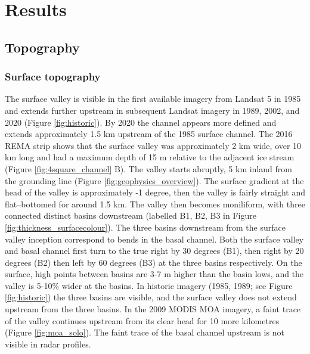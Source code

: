 
\section{Results} \label{sec:results}

\subsection{Topography} \label{sec:topography}

\subsubsection{Surface topography} \label{sec:surfacetopog}
The surface valley is visible in the first available imagery from Landsat 5 in 1985 and extends further upstream in subsequent Landsat imagery in 1989, 2002, and 2020 (Figure \ref{fig:historic}). By 2020 the channel appears more defined and extends approximately 1.5 km upstream of the 1985 surface channel. The 2016 REMA strip shows that the surface valley was approximately 2 km wide, over 10 km long and had a maximum depth of 15 m relative to the adjacent ice stream (Figure \ref{fig:4square_channel} B). The valley starts abruptly, 5 km inland from the \cite{depoorter2013amii} grounding line (Figure \ref{fig:geophysics_overview}). The surface gradient at the head of the valley is approximately -1 degree, then the valley is fairly straight and flat--bottomed for around 1.5 km. The valley then becomes moniliform, with three connected distinct basins downstream (labelled B1, B2, B3 in Figure \ref{fig:thickness_surfacecolour}).
The three basins downstream from the surface valley inception correspond to bends in the basal channel. Both the surface valley and basal channel first turn to the true right by 30 degrees (B1), then right by 20 degrees (B2) then left by 60 degrees (B3) at the three basins respectively. On the surface, high points between basins are 3-7 m higher than the basin lows, and the valley is 5-10\% wider at the basins.
In historic imagery (1985, 1989; see Figure \ref{fig:historic}) the three basins are visible, and the surface valley does not extend upstream from the three basins. 
In the 2009 MODIS MOA imagery, a faint trace of the valley continues upstream from its clear head for 10 more kilometres (Figure \ref{fig:moa_solo}). The faint trace of the basal channel upstream is not visible in radar profiles. 

